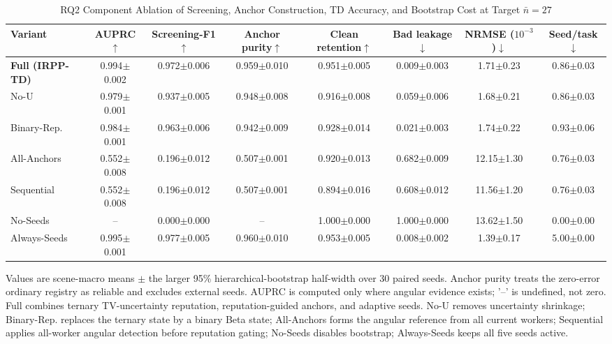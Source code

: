 \documentclass[journal]{IEEEtran}
\begin{document}
\begin{table}[!t]
\centering
\caption{RQ2 Component Ablation of Screening, Anchor Construction, TD
Accuracy, and Bootstrap Cost at Target $\bar n=27$}
\label{tab:rq2-main}
\scriptsize
\setlength{\tabcolsep}{3.25pt}
\renewcommand{\arraystretch}{0.94}
\begin{tabular}{lccccccc}
\toprule
Variant & AUPRC$\uparrow$ & Screening-F1$\uparrow$ & Anchor purity$\uparrow$ &
Clean retention$\uparrow$ & Bad leakage$\downarrow$ &
NRMSE ($10^{-3}$)$\downarrow$ & Seed/task$\downarrow$ \\
\midrule
\textbf{Full (IRPP-TD)} & 0.994$\pm$0.002 & 0.972$\pm$0.006 & 0.959$\pm$0.010 & 0.951$\pm$0.005 & 0.009$\pm$0.003 & 1.71$\pm$0.23 & 0.86$\pm$0.03 \\
No-U & 0.979$\pm$0.001 & 0.937$\pm$0.005 & 0.948$\pm$0.008 & 0.916$\pm$0.008 & 0.059$\pm$0.006 & 1.68$\pm$0.21 & 0.86$\pm$0.03 \\
Binary-Rep. & 0.984$\pm$0.001 & 0.963$\pm$0.006 & 0.942$\pm$0.009 & 0.928$\pm$0.014 & 0.021$\pm$0.003 & 1.74$\pm$0.22 & 0.93$\pm$0.06 \\
All-Anchors & 0.552$\pm$0.008 & 0.196$\pm$0.012 & 0.507$\pm$0.001 & 0.920$\pm$0.013 & 0.682$\pm$0.009 & 12.15$\pm$1.30 & 0.76$\pm$0.03 \\
Sequential & 0.552$\pm$0.008 & 0.196$\pm$0.012 & 0.507$\pm$0.001 & 0.894$\pm$0.016 & 0.608$\pm$0.012 & 11.56$\pm$1.20 & 0.76$\pm$0.03 \\
No-Seeds & -- & 0.000$\pm$0.000 & -- & 1.000$\pm$0.000 & 1.000$\pm$0.000 & 13.62$\pm$1.50 & 0.00$\pm$0.00 \\
Always-Seeds & 0.995$\pm$0.001 & 0.977$\pm$0.005 & 0.960$\pm$0.010 & 0.953$\pm$0.005 & 0.008$\pm$0.002 & 1.39$\pm$0.17 & 5.00$\pm$0.00 \\
\bottomrule
\end{tabular}
\par\vspace{0.45ex}
\noindent\parbox{0.98\textwidth}{\scriptsize
Values are scene-macro means $\pm$ the larger 95\% hierarchical-bootstrap
half-width over 30 paired seeds. Anchor purity treats the zero-error ordinary
registry as reliable and excludes external seeds. AUPRC is computed only where
angular evidence exists; '--' is undefined, not zero. Full combines ternary
TV-uncertainty reputation, reputation-guided anchors, and adaptive seeds.
No-U removes uncertainty shrinkage; Binary-Rep. replaces the ternary state by
a binary Beta state; All-Anchors forms the angular reference from all current
workers; Sequential applies all-worker angular detection before reputation
gating; No-Seeds disables bootstrap; Always-Seeds keeps all five seeds active.}
\end{table}
\end{document}
